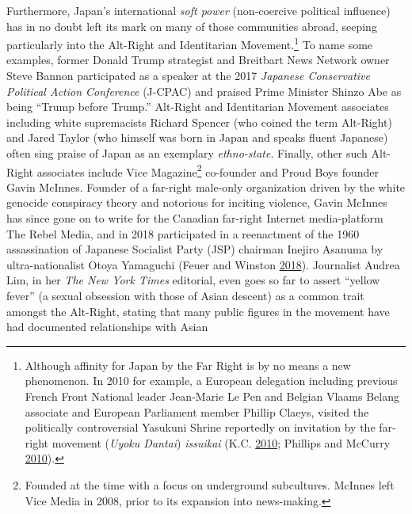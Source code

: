 \documentclass[10pt,british,A4paper,,openany]{memoir}
\begin{document}
Furthermore, Japan's international \emph{soft power} (non-coercive
political influence) has in no doubt left its mark on many of those
communities abroad, seeping particularly into the Alt-Right and
Identitarian Movement.\footnote{Although affinity for Japan by the Far
  Right is by no means a new phenomenon. In 2010 for example, a European
  delegation including previous French Front National leader Jean-Marie
  Le Pen and Belgian Vlaams Belang associate and European Parliament
  member Phillip Claeys, visited the politically controversial Yasukuni
  Shrine reportedly on invitation by the far-right movement (\emph{Uyoku
  Dantai}) \emph{issuikai} (K.C.
  \protect\hyperlink{ref-k.c._how_2010}{2010}; Phillips and McCurry
  \protect\hyperlink{ref-phillips_bnp_2010}{2010}).\label{issuikai}} To
name some examples, former Donald Trump strategist and Breitbart News
Network owner Steve Bannon participated as a speaker at the 2017
\emph{Japanese Conservative Political Action Conference} (J-CPAC) and
praised Prime Minister Shinzo Abe as being ``Trump before Trump.''
Alt-Right and Identitarian Movement associates including white
supremacists Richard Spencer (who coined the term Alt-Right) and Jared
Taylor (who himself was born in Japan and speaks fluent Japanese) often
sing praise of Japan as an exemplary \emph{ethno-state}. Finally, other
such Alt-Right associates include Vice Magazine\footnote{Founded at the
  time with a focus on underground subcultures. McInnes left Vice Media
  in 2008, prior to its expansion into news-making.} co-founder and
Proud Boys founder Gavin McInnes. Founder of a far-right male-only
organization driven by the white genocide conspiracy theory and
notorious for inciting violence, Gavin McInnes has since gone on to
write for the Canadian far-right Internet media-platform The Rebel
Media, and in 2018 participated in a reenactment of the 1960
assassination of Japanese Socialist Party (JSP) chairman Inejiro Asanuma
by ultra-nationalist Otoya Yamaguchi (Feuer and Winston
\protect\hyperlink{ref-feuer_founder_2018}{2018}). Journalist Audrea
Lim, in her \emph{The New York Times} editorial, even goes so far to
assert ``yellow fever'' (a sexual obsession with those of Asian descent)
as a common trait amongst the Alt-Right, stating that many public
figures in the movement have had documented relationships with Asian
\end{document}
